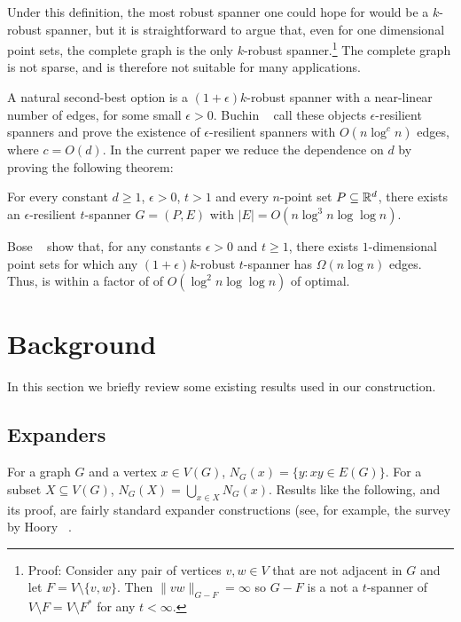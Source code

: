 \documentclass{patmorin}
\begin{document}
Under this definition, the most robust spanner one could hope for
would be a $k$-robust spanner, but it is straightforward to argue
that, even for one dimensional point sets, the complete graph is the
only $k$-robust spanner.\footnote{Proof: Consider any pair of vertices
$v,w\in V$ that are not adjacent in $G$ and let $F=V\setminus\{v,w\}$.
Then $\|vw\|_{G-F}=\infty$ so $G-F$ is a not a $t$-spanner of $V\setminus
F=V\setminus F^*$ for any $t<\infty$.} The complete graph is not sparse,
and is therefore not suitable for many applications. 

A natural second-best option is a $(1+\epsilon)k$-robust spanner with
a near-linear number of edges, for some small $\epsilon >0$.  Buchin
\etal\ \cite{buchin.har-peled.ea:spanner} call these objects $\epsilon$-resilient spanners and prove the
existence of $\epsilon$-resilient spanners with $O(n\log^c n)$ edges,
where $c=O(d)$.  In the current paper we reduce the dependence on $d$
by proving the following theorem:

\begin{thm}
  For every constant $d\ge 1$, $\epsilon>0$, $t>1$ and every $n$-point
  set $P\subseteq\mathbb{R}^d$, there exists an $\epsilon$-resilient $t$-spanner
  $G=(P,E)$ with $|E|=O(n\log^3 n\log\log n)$.
\end{thm}

Bose \etal\ \cite{bose.dujmovic.ea:robust} show that, for any constants
$\epsilon>0$ and $t\ge 1$, there exists $1$-dimensional point
sets for which any $(1+\epsilon)k$-robust $t$-spanner has $\Omega(n\log
n)$ edges.  Thus,  is within a factor of of $O(\log^2
n\log\log n)$ of optimal.


\section{Background}

In this section we briefly review some existing results used in
our construction.

\subsection{Expanders}

For a graph $G$ and a vertex $x\in V(G)$, $N_G(x) = \{ y: xy\in E(G)\}$.  For a subset $X\subseteq V(G)$, $N_G(X)=\bigcup_{x\in X} N_G(x)$.
Results like the following, and its proof, are fairly standard
expander constructions (see, for example, the survey by Hoory \etal\
\cite{hoory.linial.ea:expanders}.
\end{document}
